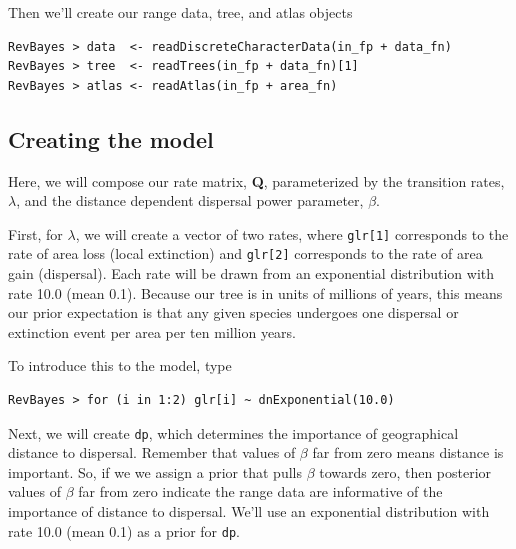 Then we'll create our range data, tree, and atlas objects

\begin{snugshade}
\begin{lstlisting}
RevBayes > data  <- readDiscreteCharacterData(in_fp + data_fn)
RevBayes > tree  <- readTrees(in_fp + data_fn)[1]
RevBayes > atlas <- readAtlas(in_fp + area_fn)
\end{lstlisting}
\end{snugshade}

%


\subsection{Creating the model}

Here, we will compose our rate matrix, {\bf Q}, parameterized by the transition rates, $\lambda$, and the distance dependent dispersal power parameter, $\beta$.

First, for $\lambda$, we will create a vector of two rates, where {\tt glr[1]} corresponds to the rate of area loss (local extinction) and {\tt glr[2]} corresponds to the rate of area gain (dispersal).
Each rate will be drawn from an exponential distribution with rate 10.0 (mean 0.1).
Because our tree is in units of millions of years, this means our prior expectation is that any given species undergoes one dispersal or extinction event per area per ten million years.

To introduce this to the model, type
\begin{snugshade}
\begin{lstlisting}
RevBayes > for (i in 1:2) glr[i] ~ dnExponential(10.0)
\end{lstlisting}
\end{snugshade}

Next, we will create {\tt dp}, which determines the importance of geographical distance to dispersal.
Remember that values of $\beta$ far from zero means distance is important.
So, if we we assign a prior that pulls $\beta$ towards zero, then posterior values of $\beta$ far from zero indicate the range data are informative of the importance of distance to dispersal.
We'll use an exponential distribution with rate 10.0 (mean 0.1) as a prior for {\tt dp}.

